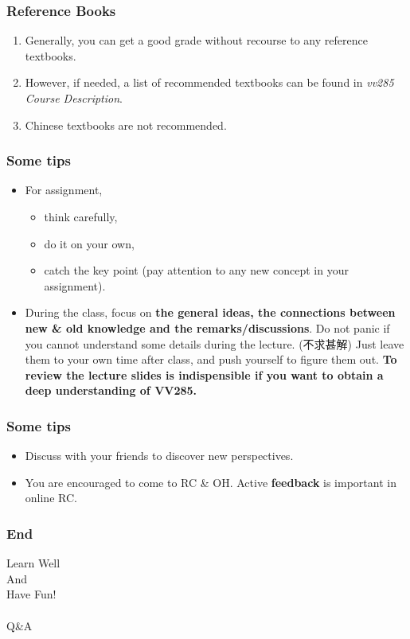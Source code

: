 \documentclass[UTF8]{beamer}
\newcommand{\nullspace}{~\\[15pt]}
\begin{document}
\begin{frame}
    \frametitle{Reference Books}
    \begin{enumerate}
        \item Generally, you can get a good grade without recourse to any reference textbooks.
        \item However, if needed, a list of recommended textbooks can be found in \textit{vv285 Course Description}.
        \item Chinese textbooks are not recommended.
    \end{enumerate}
\end{frame}

\begin{frame}
    \frametitle{Some tips}
    \begin{itemize}
        \item
              For assignment,
              \begin{itemize}
                  \item think carefully,
                  \item do it on your own,
                  \item catch the key point (pay attention to any new concept in your assignment).
              \end{itemize}
        \item During the class, focus on \textbf{the general ideas, the connections between new \& old knowledge and the remarks/discussions}. Do not panic if you cannot understand some details during the lecture. (不求甚解) Just leave them to your own time after class, and push yourself to figure them out. \textbf{To review the lecture slides is indispensible if you want to obtain a deep understanding of VV285.}
    \end{itemize}
\end{frame}

\begin{frame}
    \frametitle{Some tips}
    \begin{itemize}
        \item Discuss with your friends to discover new perspectives.
        \item You are encouraged to come to RC \& OH. Active \textbf{feedback} is important in online RC.
    \end{itemize}
\end{frame}

\begin{frame}
    \frametitle{End}
    \begin{center}
        \huge
        Learn Well\\
        And\\
        Have Fun!\\
        \nullspace
        \large
        Q\&A
    \end{center}
\end{frame}
\end{document}
